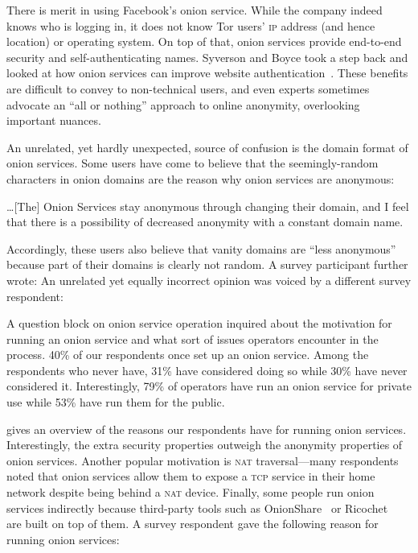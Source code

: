 There is merit in using Facebook's onion service.  While the company indeed
knows who is logging in, it does not know Tor users' \textsc{ip} address (and
hence location) or operating system.  On top of that, onion services provide
end-to-end security and self-authenticating names.  Syverson and Boyce took a
step back and looked at how onion services can improve website
authentication~\cite{Syverson2015a}.  These benefits are difficult to convey to
non-technical users, and even experts sometimes advocate an ``all or nothing''
approach to online anonymity, overlooking important nuances.

An unrelated, yet hardly unexpected, source of confusion is the domain format of
onion services.  Some users have come to believe that the seemingly-random
characters in onion domains are the reason why onion services are anonymous:

\begin{displayquote}
\ldots [The] Onion Services stay anonymous through changing their domain, and I
feel that there is a possibility of decreased anonymity with a constant domain
name.
\end{displayquote}

Accordingly, these users also believe that vanity domains are ``less anonymous''
because part of their domains is clearly not random.  A survey participant
further wrote:   An unrelated yet
equally incorrect opinion was voiced by a different survey respondent:

A question block on onion service operation inquired about the motivation for
running an onion service and what sort of issues operators encounter in the
process.  40\% of our respondents once set up an onion service.  Among the
respondents who never have, 31\% have considered doing so while 30\% have never
considered it.  Interestingly, 79\% of operators have run an onion service for
private use while 53\% have run them for the public.

 gives an overview of the reasons our
respondents have for running onion services.  Interestingly, the extra security
properties outweigh the anonymity properties of onion services.  Another popular
motivation is \textsc{nat} traversal---many respondents noted that onion
services allow them to expose a \textsc{tcp} service in their home network
despite being behind a \textsc{nat} device.  Finally, some people run onion
services indirectly because third-party tools such as
OnionShare~\cite{onionshare} or Ricochet~\cite{ricochet} are built on top of
them.  A survey respondent gave the following reason for running onion services:

